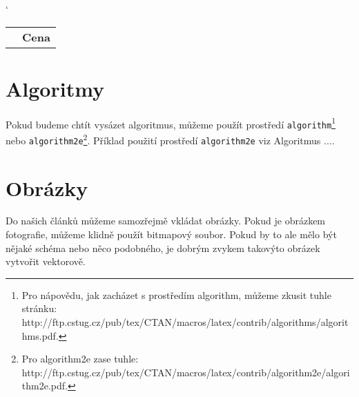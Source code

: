 \documentclass[11pt,a4paper]{article}
\begin{document}
		\begin{table}[ht]
			\catcode`
			\begin{center}
				\begin{tabular}{|l|r r|} \hline
					& \multicolumn{2}{c|}{\textbf{Cena}} \\ \cline{2-3}
				\end{tabular}			
			\end{center}
		\end{table}

	\section{Algoritmy} \label{algoritmy}
	Pokud budeme chtít vysázet algoritmus, můžeme použít prostředí \texttt{algorithm}\footnote{Pro nápovědu, jak zacházet s prostředím algorithm, můžeme zkusit tuhle stránku: http://ftp.cstug.cz/pub/tex/CTAN/macros/latex/contrib/algorithms/algorithms.pdf.} nebo \texttt{algorithm2e}\footnote{Pro algorithm2e zase tuhle: http://ftp.cstug.cz/pub/tex/CTAN/macros/latex/contrib/algorithm2e/algorithm2e.pdf.}. Příklad použití prostředí \texttt{algorithm2e} viz Algoritmus ....

	\section{Obrázky}
	Do našich článků můžeme samozřejmě vkládat obrázky. Pokud je obrázkem fotografie,
	můžeme klidně použít bitmapový soubor. Pokud by to ale mělo být nějaké schéma nebo něco podobného, je dobrým zvykem takovýto obrázek vytvořit vektorově.
\end{document}
